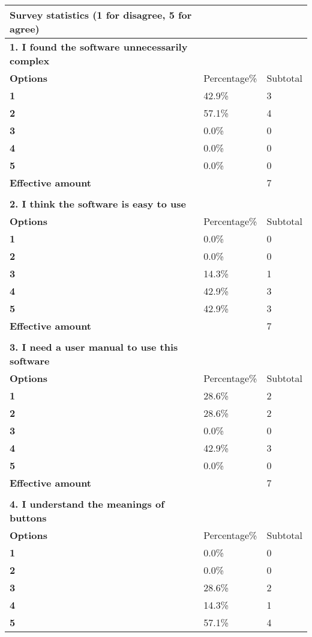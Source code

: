 \documentclass[
]{article}
\begin{document}
\begin{longtable}[]{@{}lll@{}}
\toprule
\textbf{Survey statistics (1 for disagree, 5 for agree)} & & \\
\midrule
\endhead
\textbf{1. I found the software unnecessarily complex } & & \\
\textbf{Options} & Percentage\% & Subtotal \\
\textbf{1} & 42.9\% & 3 \\
\textbf{2} & 57.1\% & 4 \\
\textbf{3} & 0.0\% & 0 \\
\textbf{4} & 0.0\% & 0 \\
\textbf{5} & 0.0\% & 0 \\
\textbf{Effective amount} & & 7 \\
& & \\
\textbf{2. I think the software is easy to use } & & \\
\textbf{Options} & Percentage\% & Subtotal \\
\textbf{1} & 0.0\% & 0 \\
\textbf{2} & 0.0\% & 0 \\
\textbf{3} & 14.3\% & 1 \\
\textbf{4} & 42.9\% & 3 \\
\textbf{5} & 42.9\% & 3 \\
\textbf{Effective amount} & & 7 \\
& & \\
\textbf{3. I need a user manual to use this software} & & \\
\textbf{Options} & Percentage\% & Subtotal \\
\textbf{1} & 28.6\% & 2 \\
\textbf{2} & 28.6\% & 2 \\
\textbf{3} & 0.0\% & 0 \\
\textbf{4} & 42.9\% & 3 \\
\textbf{5} & 0.0\% & 0 \\
\textbf{Effective amount} & & 7 \\
& & \\
\textbf{4. I understand the meanings of buttons} & & \\
\textbf{Options} & Percentage\% & Subtotal \\
\textbf{1} & 0.0\% & 0 \\
\textbf{2} & 0.0\% & 0 \\
\textbf{3} & 28.6\% & 2 \\
\textbf{4} & 14.3\% & 1 \\
\textbf{5} & 57.1\% & 4 \\

\end{longtable}
\end{document}
